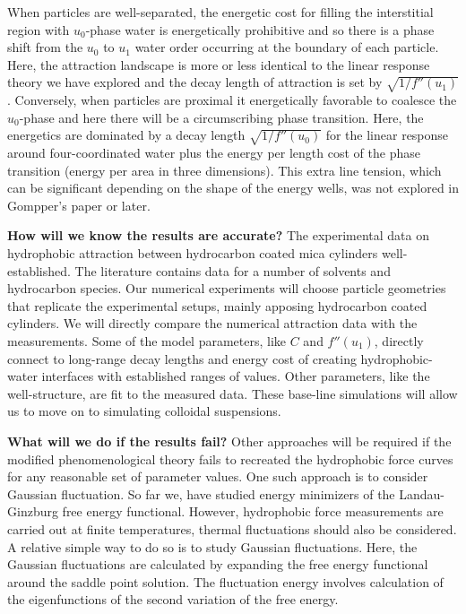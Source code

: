 When particles are well-separated, the energetic cost for filling the interstitial region 
with $u_0$-phase water is energetically prohibitive and so there is a phase shift
from the $u_0$ to $u_1$ water order occurring at the boundary of each particle. 
Here, the attraction landscape is more or less identical to the linear response theory 
we have explored and the decay length of attraction is set by $\sqrt{1/f''(u_1)}$.
Conversely, when particles are proximal it energetically favorable to coalesce 
the $u_0$-phase and here there will be a circumscribing phase transition.
Here, the energetics are dominated by a decay length  $\sqrt{1/f''(u_0)}$
for the linear response around four-coordinated water plus the energy 
per length cost of the phase transition (energy per area in three dimensions).
This extra line tension, which can be significant depending on the shape of the 
energy wells, was not explored in Gompper's paper or later. 

\textbf{How will we know the results are accurate?}
The experimental data on hydrophobic attraction between 
hydrocarbon coated mica cylinders well-established. 
The literature contains data for a number of solvents and hydrocarbon species.
Our numerical experiments will choose particle geometries that replicate the 
experimental setups, mainly apposing hydrocarbon coated cylinders. 
We will directly compare the numerical attraction data with the measurements.
Some of the model parameters, like $C$ and  $f''(u_1)$, directly connect 
to long-range decay lengths and energy cost of creating hydrophobic-water
interfaces with established ranges of values. Other parameters, like the well-structure,
are fit to the measured data. 
These base-line simulations will allow us to move on to simulating
colloidal suspensions. 

\textbf{What will we do if the results fail?}
Other approaches will be required if the modified phenomenological theory 
fails to recreated the hydrophobic force curves for any reasonable 
set of parameter values.  One such approach is to consider 
Gaussian fluctuation. 
So far we, have studied energy minimizers of the Landau-Ginzburg 
free energy functional. However,  hydrophobic force measurements are carried out at finite 
temperatures, thermal fluctuations should also be considered. 
A relative simple way to do so is to study Gaussian fluctuations.
Here, the Gaussian fluctuations are calculated by expanding the 
free energy functional around the saddle point solution.
The fluctuation energy involves calculation of the eigenfunctions of the second variation
of the free energy. 

